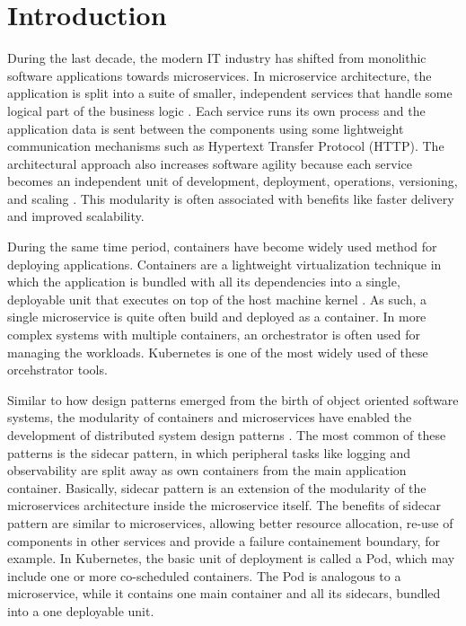 \documentclass[english, 12pt, a4paper, sci, utf8, a-2b, online]{aaltothesis}
\begin{document}
\cleardoublepage

\thispagestyle{empty}

\section{Introduction} \label{sec:intro}

During the last decade, the modern IT industry has shifted from monolithic software applications towards microservices. In microservice architecture, the application is split into a suite of smaller, independent services that handle some logical part of the business logic \cite{fowler2014microservices}. Each service runs its own process and the application data is sent between the components using some lightweight communication mechanisms such as Hypertext Transfer Protocol (HTTP). The architectural approach also increases software agility because each service becomes an independent unit of development, deployment, operations, versioning, and scaling \cite{jamshidi2018microservices}. This modularity is often associated with benefits like faster delivery and improved scalability.

During the same time period, containers have become widely used method for deploying applications. Containers are a lightweight virtualization technique in which the application is bundled with all its dependencies into a single, deployable unit that executes on top of the host machine kernel \cite{bui2015analysis}. As such, a single microservice is quite often build and deployed as a container. In more complex systems with multiple containers, an orchestrator is often used for managing the workloads. Kubernetes is one of the most widely used of these orcehstrator tools.

Similar to how design patterns emerged from the birth of object oriented software systems, the modularity of containers and microservices have enabled the development of distributed system design patterns \cite{burns2016design}. The most common of these patterns is the sidecar pattern, in which peripheral tasks like logging and observability are split away as own containers from the main application container. Basically, sidecar pattern is an extension of the modularity of the microservices architecture inside the microservice itself. The benefits of sidecar pattern are similar to microservices, allowing better resource allocation, re-use of components in other services and provide a failure containement boundary, for example. In Kubernetes, the basic unit of deployment is called a Pod, which may include one or more co-scheduled containers. The Pod is analogous to a microservice, while it contains one main container and all its sidecars, bundled into a one deployable unit.
\end{document}
